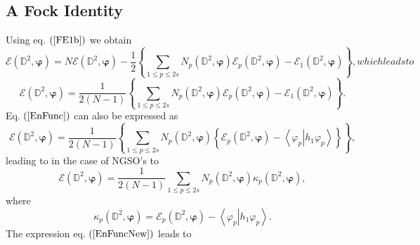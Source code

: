 \documentclass[aps,preprint]{revtex4}%
\begin{document}
\subsection{A Fock Identity\label{FockID}}

Using eq. $\left(  \ref{FE1b}\right)  $ we obtain
\begin{subequations}
\begin{equation}
\mathcal{E}\left(  \mathbb{D}^{2},\mathbf{\varphi}\right)  =N\mathcal{E}%
\left(  \mathbb{D}^{2},\mathbf{\varphi}\right)  -\frac{1}{2}\left\{
\sum_{1\leq p\leq2s}N_{p}\left(  \mathbb{D}^{2},\mathbf{\varphi}\right)
\mathcal{E}_{p}\left(  \mathbb{D}^{2},\mathbf{\varphi}\right)  -\mathcal{E}%
_{1}\left(  \mathbb{D}^{2},\mathbf{\varphi}\right)  \right\}  ,
\end{equation}
which leads to
\end{subequations}
\begin{equation}
\mathcal{E}\left(  \mathbb{D}^{2},\mathbf{\varphi}\right)  =\frac{1}{2\left(
N-1\right)  }\left\{  \sum_{1\leq p\leq2s}N_{p}\left(  \mathbb{D}%
^{2},\mathbf{\varphi}\right)  \mathcal{E}_{p}\left(  \mathbb{D}^{2}%
,\mathbf{\varphi}\right)  -\mathcal{E}_{1}\left(  \mathbb{D}^{2}%
,\mathbf{\varphi}\right)  \right\}  . \label{EnFunc}%
\end{equation}
Eq. $\left(  \ref{EnFunc}\right)  $ can also be expressed as
\begin{equation}
\mathcal{E}\left(  \mathbb{D}^{2},\mathbf{\varphi}\right)  =\frac{1}{2\left(
N-1\right)  }\left\{  \sum_{1\leq p\leq2s}N_{p}\left(  \mathbb{D}%
^{2},\mathbf{\varphi}\right)  \left\{  \mathcal{E}_{p}\left(  \mathbb{D}%
^{2},\mathbf{\varphi}\right)  -\left\langle \left.  \varphi_{p}\right\vert
h_{1}\varphi_{p}\right\rangle \right\}  \right\}  , \label{EnFuncNew}%
\end{equation}
leading to in the case of NGSO's to
\begin{equation}
\mathcal{E}\left(  \mathbb{D}^{2},\mathbf{\varphi}\right)  =\frac{1}{2\left(
N-1\right)  }\sum_{1\leq p\leq2s}N_{p}\left(  \mathbb{D}^{2},\mathbf{\varphi
}\right)  \kappa_{p}\left(  \mathbb{D}^{2},\mathbf{\varphi}\right)  ,
\end{equation}
where
\begin{equation}
\kappa_{p}\left(  \mathbb{D}^{2},\mathbf{\varphi}\right)  =\mathcal{E}%
_{p}\left(  \mathbb{D}^{2},\mathbf{\varphi}\right)  -\left\langle \left.
\varphi_{p}\right\vert h_{1}\varphi_{p}\right\rangle .
\end{equation}
The expression eq. $\left(  \ref{EnFuncNew}\right)  $ leads to
\end{document}
